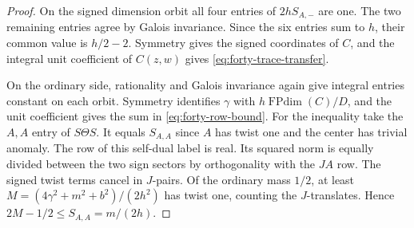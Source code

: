 \documentclass[11pt,reqno]{amsart}
\theoremstyle{remark}\newtheorem{remark}[theorem]{Remark}
\numberwithin{equation}{section}
\begin{document}
\begin{proof}
On the signed dimension orbit all four entries of $2hS_{A,-}$ are one.
The two remaining entries agree by Galois invariance. Since the six
entries sum to $h$, their common value is $h/2-2$. Symmetry gives the
signed coordinates of $C$, and the integral unit coefficient of
$C(z,w)$ gives \eqref{eq:forty-trace-transfer}.

On the ordinary side, rationality and Galois invariance again give
integral entries constant on each orbit. Symmetry identifies
$\gamma$ with $h\operatorname{FPdim}(C)/D$, and the unit coefficient
gives the sum in \eqref{eq:forty-row-bound}. For the inequality take the $A,A$ entry of $S\Theta S$.
It equals $S_{A,A}$ since $A$ has twist one and the center has
trivial anomaly. The row of this self-dual label is real.
Its squared norm is equally divided between the two sign sectors
by orthogonality with the $JA$ row. The signed twist terms cancel
in $J$-pairs. Of the ordinary mass $1/2$, at least
$M=(4\gamma^2+m^2+b^2)/(2h^2)$ has twist one, counting the
$J$-translates. Hence $2M-1/2\le S_{A,A}=m/(2h)$.
\end{proof}
\end{document}
